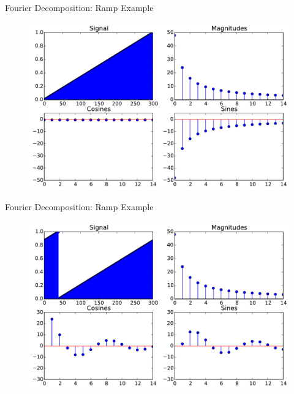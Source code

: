 \documentclass{beamer}
\begin{document}
\begin{frame}{Fourier Decomposition: Ramp Example}

\begin{figure}[t]
    \includegraphics[width=\textwidth]{Ramp1/SignalDecomposition.pdf}
\end{figure}

\end{frame}

\begin{frame}{Fourier Decomposition: Ramp Example}

\begin{figure}[t]
    \includegraphics[width=\textwidth]{Ramp2/SignalDecomposition.pdf}
\end{figure}

\end{frame}
\end{document}
